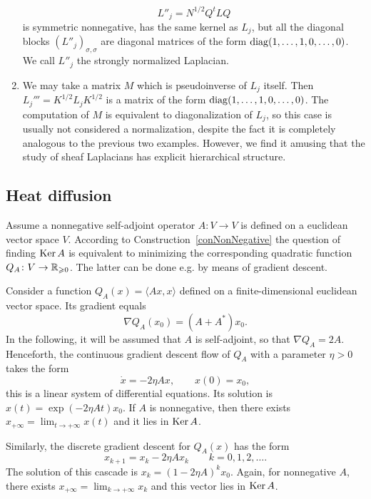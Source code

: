 \begin{con}
\begin{enumerate}
  \begin{equation}\label{eqStronglyNormalized}
  L''_j=N^{1/2}Q^tLQ
  \end{equation}
  is symmetric nonnegative, has the same kernel as $L_j$, but all the diagonal blocks $(L''_j)_{\sigma,\sigma}$ are diagonal matrices of the form $\operatorname{diag}(1,\ldots,1,0,\ldots,0)$. We call $L''_j$ the strongly normalized Laplacian.
  \item We may take a matrix $M$ which is pseudoinverse of $L_j$ itself. Then $L_j'''=K^{1/2}L_jK^{1/2}$ is a matrix of the form $\operatorname{diag}(1,\ldots,1,0,\ldots,0)$. The computation of $M$ is equivalent to diagonalization of $L_j$, so this case is usually not considered a normalization, despite the fact it is completely analogous to the previous two examples. However, we find it amusing that the study of sheaf Laplacians has explicit hierarchical structure.
\end{enumerate}
\end{con}

\subsection{Heat diffusion}\label{subsecMathDiffusion}

Assume a nonnegative self-adjoint operator $A\colon V\to V$ is defined on a euclidean vector space $V$. According to Construction~\ref{conNonNegative} the question of finding $\operatorname{Ker} A$ is equivalent to minimizing the corresponding quadratic function $Q_A\colon V\to\mathbb{R}_{\geqslant 0}$. The latter can be done e.g. by means of gradient descent.

\begin{con}\label{conGradientHeat}
Consider a function $Q_A(x)=\langle Ax,x\rangle$ defined on a finite-dimensional euclidean vector space. Its gradient equals
\begin{equation}\label{eqGradientOfQuadratic}
\nabla Q_A(x_0)=(A+A^*)x_0.
\end{equation}
In the following, it will be assumed that $A$ is self-adjoint, so that $\nabla Q_A=2A$. Henceforth, the continuous gradient descent flow of $Q_A$ with a parameter $\eta>0$ takes the form
\begin{equation}\label{eqGradFlowContinuous}
\dot{x}=-2\eta Ax,\qquad x(0)=x_0,
\end{equation}
this is a linear system of differential equations. Its solution is $x(t)=\exp(-2\eta At)x_0$. If $A$ is nonnegative, then there exists $x_{+\infty}=\lim_{t\to+\infty} x(t)$ and it lies in $\operatorname{Ker} A$.

Similarly, the discrete gradient descent for $Q_A(x)$ has the form
\begin{equation}\label{eqGradFlowDiscrete}
x_{k+1}=x_k-2\eta Ax_k\qquad k=0,1,2,\ldots.
\end{equation}
The solution of this cascade is $x_k=(1-2\eta A)^kx_0$. Again, for nonnegative $A$, there exists $x_{+\infty}=\lim_{k\to+\infty} x_k$ and this vector lies in $\operatorname{Ker} A$.
\end{con}

